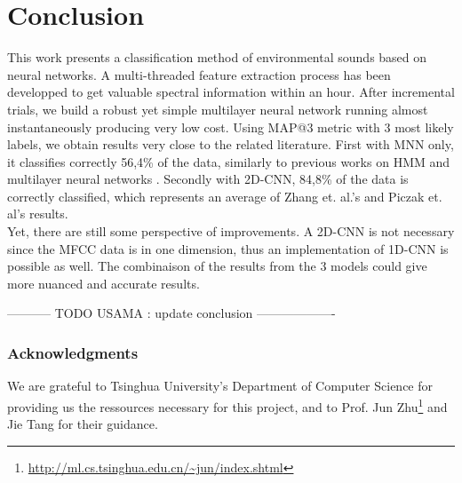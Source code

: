 \documentclass{article} %
\begin{document}
\section{Conclusion}

	This work presents a classification method of environmental sounds based on neural networks. A multi-threaded feature extraction process has been developped to get valuable spectral information within an hour. After incremental trials, we build a robust yet simple multilayer neural network running almost instantaneously producing very low cost. Using MAP@3 metric with 3 most likely labels, we obtain results very close to the related literature. First with MNN only, it classifies correctly 56,4\% of the data, similarly to previous works on HMM \cite{Dufaux} and multilayer neural networks \cite{Toyoda}. Secondly with 2D-CNN, 84,8\% of the data is correctly classified, which represents an average of Zhang et. al.'s \cite{Zhang} and Piczak et. al's \cite{Piczak} results. \\
	Yet, there are still some perspective of improvements. A 2D-CNN is not necessary since the MFCC data is in one dimension, thus an implementation of 1D-CNN is possible as well. The combinaison of the results from the 3 models could give more nuanced and accurate results.

	----------- TODO USAMA : update conclusion  -------------------

\subsubsection*{Acknowledgments}
	We are grateful to Tsinghua University's Department of Computer Science for providing us the ressources necessary for this project,
	and to Prof. Jun Zhu\footnote{\url{http://ml.cs.tsinghua.edu.cn/~jun/index.shtml}} and Jie Tang for their guidance.

\nocite{*}


\end{document}

